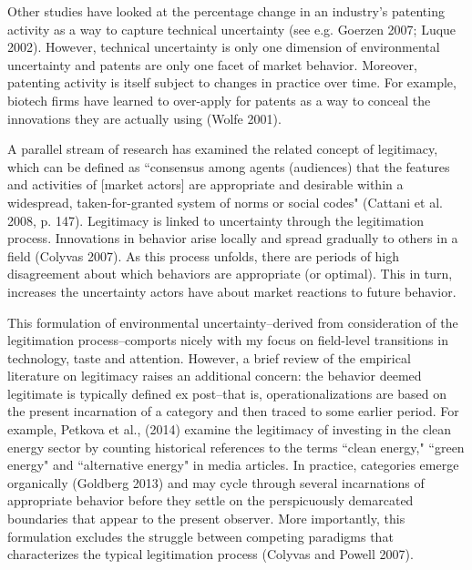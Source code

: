 Other studies have looked at the percentage change in an industry's patenting activity as a way to capture technical uncertainty (see e.g. Goerzen 2007; Luque 2002). However, technical uncertainty is only one dimension of environmental uncertainty and patents are only one facet of market behavior. Moreover, patenting activity is itself subject to changes in practice over time. For example, biotech firms have learned to over-apply for patents as a way to conceal the innovations they are actually using (Wolfe 2001).

A parallel stream of research has examined the related concept of legitimacy, which can be defined as ``consensus among agents (audiences) that the features and activities of [market actors] are appropriate and desirable within a widespread, taken-for-granted system of norms or social codes" (Cattani et al. 2008, p. 147). Legitimacy is linked to uncertainty through the legitimation process. Innovations in behavior arise locally and spread gradually to others in a field (Colyvas 2007). As this process unfolds, there are periods of high disagreement about which behaviors are appropriate (or optimal). This in turn, increases the uncertainty actors have about market reactions to future behavior.

This formulation of environmental uncertainty--derived from consideration of the legitimation process--comports nicely with my focus on field-level transitions in technology, taste and attention. However, a brief review of the empirical literature on legitimacy raises an additional concern: the behavior deemed legitimate is typically defined ex post--that is, operationalizations are based on the present incarnation of a category and then traced to some earlier period. For example, Petkova et al., (2014) examine the legitimacy of investing in the clean energy sector by counting historical references to the terms ``clean energy," ``green energy" and ``alternative energy" in media articles. In practice, categories emerge organically (Goldberg 2013) and may cycle through several incarnations of appropriate behavior before they settle on the perspicuously demarcated boundaries that appear to the present observer. More importantly, this formulation excludes the struggle between competing paradigms that characterizes the typical legitimation process (Colyvas and Powell 2007).

